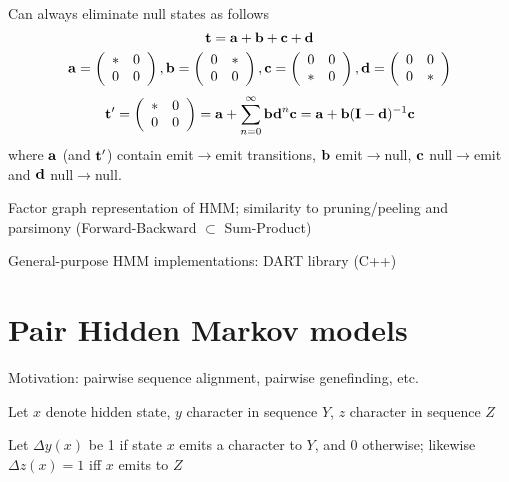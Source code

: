 \documentclass{beamer}
\begin{document}
\begin{frame}{}
\small
Can always eliminate null states as follows
\[
{\bf t} = {\bf a} + {\bf b} + {\bf c} + {\bf d}
\]
\[
{\bf a} = \left( \begin{array}{ll} \ast & 0 \\ 0 & 0 \end{array} \right),
{\bf b} = \left( \begin{array}{ll} 0 & \ast \\ 0 & 0 \end{array} \right),
{\bf c} = \left( \begin{array}{ll} 0 & 0 \\ \ast & 0 \end{array} \right),
{\bf d} = \left( \begin{array}{ll} 0 & 0 \\ 0 & \ast \end{array} \right)
\]
\[
{\bf t}' = \left( \begin{array}{ll} \ast & 0 \\ 0 & 0 \end{array} \right)
= {\bf a} + \sum_{n=0}^\infty {\bf bd}^n {\bf c} = {\bf a} + {\bf b} ({\bf I} - {\bf d})^{-1} {\bf c}
\]
where ${\bf a}$ (and ${\bf t}'$) contain emit$\to$emit transitions,
 ${\bf b}$ emit$\to$null,
 ${\bf c}$ null$\to$emit and
 ${\bf d}$ null$\to$null.
\end{frame}

\begin{frame}{}
\itemb
\item Factor graph representation of HMM; similarity to pruning/peeling and parsimony (Forward-Backward $\subset$ Sum-Product)
\item General-purpose HMM implementations: DART library (C++)
\iteme

\end{frame}

\section{Pair Hidden Markov models}

\begin{frame}{}

\itemb
\item Motivation: pairwise sequence alignment, pairwise genefinding, etc.
\item Let $x$ denote hidden state, $y$ character in sequence $Y$, $z$ character in sequence $Z$
\item Let $\Delta y(x)$ be 1 if state $x$ emits a character to $Y$, and 0 otherwise; likewise $\Delta z(x)=1$ iff $x$ emits to $Z$
\iteme
\end{frame}
\end{document}

